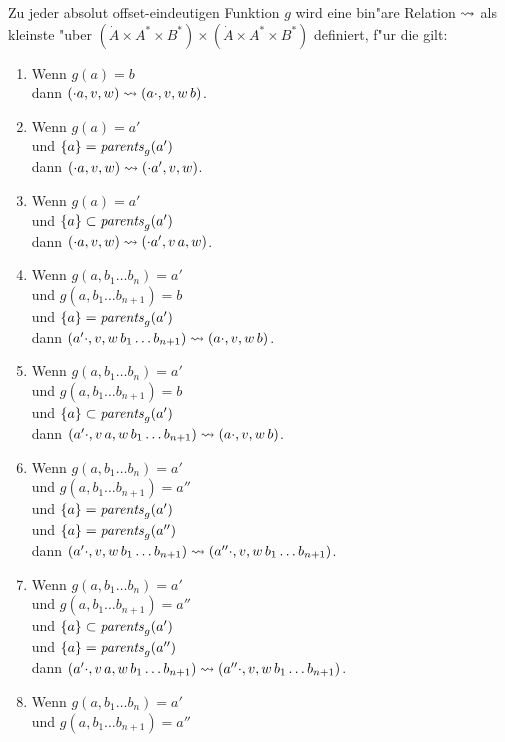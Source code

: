 \documentclass[12pt,a4paper]{article}
\begin{document}
Zu jeder absolut offset-eindeutigen Funktion $g$ wird eine bin"are Relation $\rightsquigarrow$ als kleinste
"uber $(\dot{A} \times A^* \times B^*) \times (\dot{A} \times A^* \times B^*)$ definiert, f"ur
die gilt:
\begin{enumerate}
\item Wenn $g(a) = b$ \\
  dann $(\cdot a,v,w) \rightsquigarrow (a \cdot,v,w\,b)$.
\item Wenn $g(a) = a'$ \\
  und $\{a\} = \mathit{parents}_g(a')$ \\
  dann $(\cdot a,v,w) \rightsquigarrow (\cdot a',v,w)$.
\item Wenn $g(a) = a'$ \\
  und $\{a\} \subset \mathit{parents}_g(a')$ \\
  dann $(\cdot a,v,w) \rightsquigarrow (\cdot a',v\,a,w)$.
\item Wenn $g(a,b_1 \ldots b_n) = a'$ \\
  und $g(a,b_1 \ldots b_{n+1})=b$ \\
  und $\{a\} = \mathit{parents}_g(a')$ \\
  dann $(a' \cdot,v,w\,b_1 \ldots b_{n+1}) \rightsquigarrow (a \cdot,v,w\,b)$.
\item Wenn $g(a,b_1 \ldots b_n) = a'$ \\
  und $g(a,b_1 \ldots b_{n+1}) = b$ \\
  und $\{a\} \subset \mathit{parents}_g(a')$ \\
  dann $(a' \cdot,v\,a,w\,b_1 \ldots b_{n+1}) \rightsquigarrow (a \cdot,v,w\,b)$.
\item Wenn $g(a,b_1 \ldots b_n) = a'$ \\
  und $g(a,b_1 \ldots b_{n+1}) = a''$ \\
  und $\{a\} = \mathit{parents}_g(a')$ \\
  und $\{a\} = \mathit{parents}_g(a'')$ \\
  dann $(a' \cdot,v,w\,b_1 \ldots b_{n+1}) \rightsquigarrow (a'' \cdot,v,w\,b_1 \ldots b_{n+1})$.
\item Wenn $g(a,b_1 \ldots b_n) = a'$ \\
  und $g(a,b_1 \ldots b_{n+1}) = a''$ \\
  und $\{a\} \subset \mathit{parents}_g(a')$ \\
  und $\{a\} = \mathit{parents}_g(a'')$ \\
  dann $(a' \cdot,v\,a,w\,b_1 \ldots b_{n+1}) \rightsquigarrow (a'' \cdot,v,w\,b_1 \ldots b_{n+1})$.
\item Wenn $g(a,b_1 \ldots b_n) = a'$ \\
  und $g(a,b_1 \ldots b_{n+1}) = a''$ \\

\end{enumerate}
\end{document}

